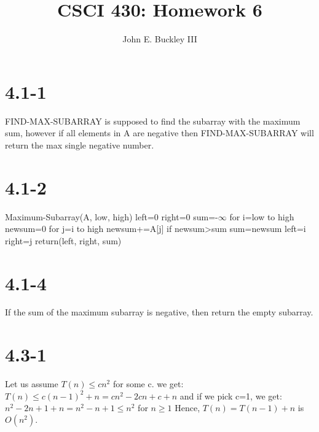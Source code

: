 \documentclass[12pt]{article}
\author{John E. Buckley III}
\title{CSCI 430: Homework 6}
\newcommand\tab[1][1cm]{\hspace*{#1}}
\begin{document}
\maketitle

\section{4.1-1}
FIND-MAX-SUBARRAY is supposed to find the subarray with the maximum sum, however if all elements in A are negative then FIND-MAX-SUBARRAY will return the max single negative number.

\section{4.1-2}
Maximum-Subarray(A, low, high) \newline
\tab left=0 \newline
\tab right=0 \newline
\tab sum=-$\infty$ \newline
\tab for i=low to high \newline
\tab \tab newsum=0 \newline
\tab \tab for j=i to high \newline
\tab \tab \tab newsum+=A[j] \newline
\tab \tab \tab if newsum>sum \newline
\tab \tab \tab \tab sum=newsum \newline
\tab \tab \tab \tab left=i \newline
\tab \tab \tab \tab right=j \newline
return(left, right, sum)

\section{4.1-4}
If the sum of the maximum subarray is negative, then return the empty subarray.

\section{4.3-1}
Let us assume $T(n)\leq cn^2$ for some c. we get: \newline
$T(n)\leq c(n-1)^2+n=cn^2-2cn+c+n$ \newline
and if we pick c=1, we get: \newline
$n^2-2n+1+n=n^2-n+1\leq n^2$ for $n\geq 1$ \newline
Hence, $T(n)=T(n-1)+n$ is $O(n^2).$
\end{document}
